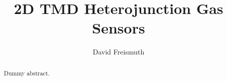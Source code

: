 \documentclass{article}
\begin{document}
\title{2D TMD Heterojunction Gas Sensors}
\author{David Freismuth}

\maketitle

\begin{abstract}
Dummy abstract.
\end{abstract}










\printglossaries
\end{document}
